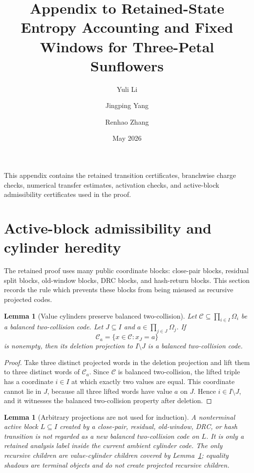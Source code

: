 \documentclass[11pt]{article}
\title{Appendix to Retained-State Entropy Accounting and Fixed Windows for Three-Petal Sunflowers}
\author{Yuli Li \and Jingping Yang \and Renhao Zhang}
\date{May 2026}
\newtheorem{lemma}[theorem]{Lemma}
\theoremstyle{remark}
\newcommand{\C}{\mathcal C}
\begin{document}
\maketitle

This appendix contains the retained transition certificates, branchwise charge checks, numerical transfer estimates, activation checks, and active-block admissibility certificates used in the proof.

\appendix


\section{Active-block admissibility and cylinder heredity}\label{app:active-admissibility}

The retained proof uses many public coordinate blocks: close-pair blocks, residual split blocks, old-window blocks, DRC blocks, and hash-return blocks.  This section records the rule which prevents these blocks from being misused as recursive projected codes.

\begin{lemma}[Value cylinders preserve balanced two-collision]\label{lem:app-cylinder-heredity}
Let $\C\subseteq\prod_{i\in I}\Omega_i$ be a balanced two-collision code.  Let $J\subseteq I$ and $a\in\prod_{j\in J}\Omega_j$.  If
\[
        \C_a=\{x\in\C:x_J=a\}
\]
is nonempty, then its deletion projection to $I\setminus J$ is a balanced two-collision code.
\end{lemma}

\begin{proof}
Take three distinct projected words in the deletion projection and lift them to three distinct words of $\C_a$.  Since $\C$ is balanced two-collision, the lifted triple has a coordinate $i\in I$ at which exactly two values are equal.  This coordinate cannot lie in $J$, because all three lifted words have value $a$ on $J$.  Hence $i\in I\setminus J$, and it witnesses the balanced two-collision property after deletion.
\end{proof}

\begin{lemma}[Arbitrary projections are not used for induction]\label{lem:app-no-projection-induction}
A nonterminal active block $L\subseteq I$ created by a close-pair, residual, old-window, DRC, or hash transition is not regarded as a new balanced two-collision code on $L$.  It is only a retained analysis label inside the current ambient cylinder code.  The only recursive children are value-cylinder children covered by Lemma~\ref{lem:app-cylinder-heredity}; equality shadows are terminal objects and do not create projected recursive children.
\end{lemma}
\end{document}
